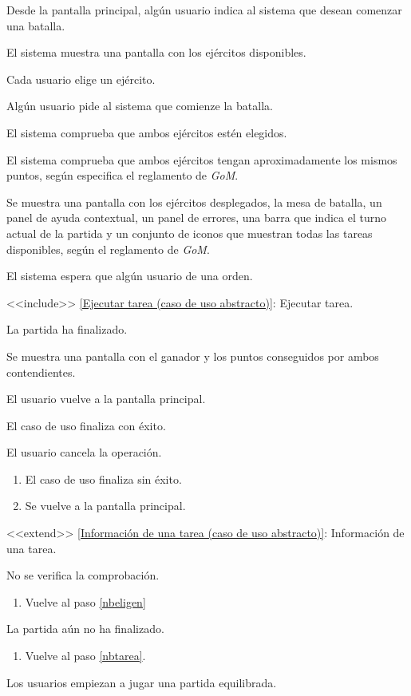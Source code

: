 {
  \item Desde la pantalla principal, algún usuario indica al sistema que desean comenzar una batalla.
  \item El sistema muestra una pantalla con los ejércitos disponibles.\label{nbini}
  \item Cada usuario elige un ejército. \label{nbeligen}
  \item Algún usuario pide al sistema que comienze la batalla.
  \item El sistema comprueba que ambos ejércitos estén elegidos. \label{nbcompeligen}
  \item El sistema comprueba que ambos ejércitos tengan aproximadamente los mismos puntos, según especifica el reglamento de \textit{GoM}. \label{nbpuntos}
  \item Se muestra una pantalla con los ejércitos desplegados, la mesa de batalla, un panel de ayuda contextual, un panel de errores, una barra que indica el turno actual de la partida y un conjunto de iconos que muestran todas las tareas disponibles, según el reglamento de \textit{GoM}.
  \item El sistema espera que algún usuario de una orden. \label{nbtarea}
  \item <<include>> \ref{Ejecutar tarea (caso de uso abstracto)}: Ejecutar tarea.
  \item La partida ha finalizado. \label{nbfinpartida}
  \item Se muestra una pantalla con el ganador y los puntos conseguidos por ambos contendientes.
  \item El usuario vuelve a la pantalla principal.
  \item El caso de uso finaliza con éxito.
}
{
  \item[\ref{nbini}-\ref{nbfinpartida}:] El usuario cancela la operación. 
    \begin{enumerate}
    \item El caso de uso finaliza sin éxito.
    \item Se vuelve a la pantalla principal.
    \end{enumerate}
\item[\ref{nbtarea}:] <<extend>> \ref{Información de una tarea (caso de uso abstracto)}: Información de una tarea.
  \item[\ref{nbcompeligen}, \ref{nbpuntos}:] No se verifica la comprobación.
    \begin{enumerate}
    \item Vuelve al paso \ref{nbeligen}
    \end{enumerate}
  \item[\ref{nbfinpartida}:] La partida aún no ha finalizado.
    \begin{enumerate}
    \item Vuelve al paso \ref{nbtarea}.
    \end{enumerate}
}{Los usuarios empiezan a jugar una partida equilibrada.}
